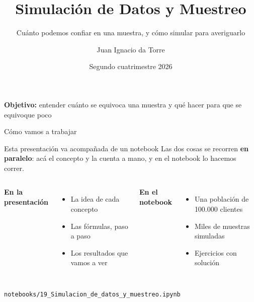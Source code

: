 \documentclass[aspectratio=169,10pt]{beamer}
\title{Simulación de Datos y Muestreo}
\subtitle{Cuánto podemos confiar en una muestra, y cómo simular para averiguarlo}
\author{Juan Ignacio da Torre}
\institute{
    Laboratorio de Métodos Cuantitativos Aplicados a la Gestión \\
    Universidad de Buenos Aires
}
\date{Segundo cuatrimestre 2026}
\begin{document}
\begin{frame}
\titlepage
\vspace{-0.5cm}
\begin{center}
\textbf{Objetivo:} entender cuánto se equivoca una muestra y qué hacer para que se equivoque poco
\end{center}
\end{frame}

\begin{frame}{Cómo vamos a trabajar}
\begin{block}{Esta presentación va acompañada de un notebook}
Las dos cosas se recorren \textbf{en paralelo}: acá el concepto y la cuenta a mano, y en el notebook lo hacemos correr.
\end{block}
\vspace{0.3cm}
\begin{columns}[T]
\textbf{En la presentación}
\begin{itemize}
  \item La idea de cada concepto
  \item Las fórmulas, paso a paso
  \item Los resultados que vamos a ver
\end{itemize}
\textbf{En el notebook}
\begin{itemize}
  \item Una población de 100.000 clientes
  \item Miles de muestras simuladas
  \item Ejercicios con solución
\end{itemize}
\end{columns}
\vspace{0.3cm}
\begin{center}
\small\texttt{notebooks/19\_Simulacion\_de\_datos\_y\_muestreo.ipynb}
\end{center}
\end{frame}
\end{document}
